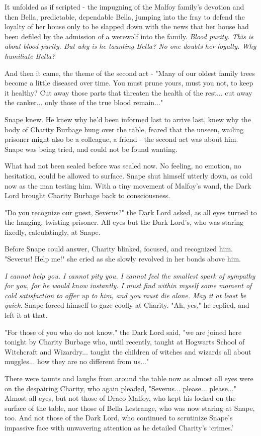 It unfolded as if scripted - the impugning of the Malfoy family's devotion and then Bella, predictable, dependable Bella, jumping into the fray to defend the loyalty of her house only to be slapped down with the news that her house had been defiled by the admission of a werewolf into the family. \emph{Blood purity. This is about blood purity. But why is he taunting Bella? No one doubts her loyalty. Why humiliate Bella?}

And then it came, the theme of the second act - "Many of our oldest family trees become a little diseased over time. You must prune yours, must you not, to keep it healthy? Cut away those parts that threaten the health of the rest... cut away the canker... only those of the true blood remain..."

Snape knew. He knew why he'd been informed last to arrive last, knew why the body of Charity Burbage hung over the table, feared that the unseen, wailing prisoner might also be a colleague, a friend - the second act was about him. Snape was being tried, and could not be found wanting.

What had not been sealed before was sealed now. No feeling, no emotion, no hesitation, could be allowed to surface. Snape shut himself utterly down, as cold now as the man testing him. With a tiny movement of Malfoy's wand, the Dark Lord brought Charity Burbage back to consciousness.

"Do you recognize our guest, Severus?" the Dark Lord asked, as all eyes turned to the hanging, twisting prisoner. All eyes but the Dark Lord's, who was staring fixedly, calculatingly, at Snape.

Before Snape could answer, Charity blinked, focused, and recognized him. "Severus! Help me!" she cried as she slowly revolved in her bonds above him.

\emph{I cannot help you. I cannot pity you. I cannot feel the smallest spark of sympathy for you, for he would know instantly. I must find within myself some moment of cold satisfaction to offer up to him, and you must die alone. May it at least be quick.} Snape forced himself to gaze coolly at Charity. "Ah, yes," he replied, and left it at that.

"For those of you who do not know," the Dark Lord said, "we are joined here tonight by Charity Burbage who, until recently, taught at Hogwarts School of Witchcraft and Wizardry... taught the children of witches and wizards all about muggles... how they are no different from us..."

There were taunts and laughs from around the table now as almost all eyes were on the despairing Charity, who again pleaded, "Severus... please... please..." Almost all eyes, but not those of Draco Malfoy, who kept his locked on the surface of the table, nor those of Bella Lestrange, who was now staring at Snape, too. And not those of the Dark Lord, who continued to scrutinize Snape's impassive face with unwavering attention as he detailed Charity's `crimes.'

